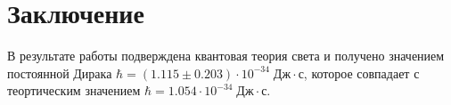 \section{Заключение}

    В результате работы подверждена квантовая теория света и получено значением постоянной Дирака $\hbar = (1.115 \pm 0.203) \cdot 10^{-34} \; \text{Дж} \cdot \text{с}$, которое совпадает с теортическим значением $\hbar = 1.054 \cdot 10^{-34} \; \text{Дж} \cdot \text{с}$.